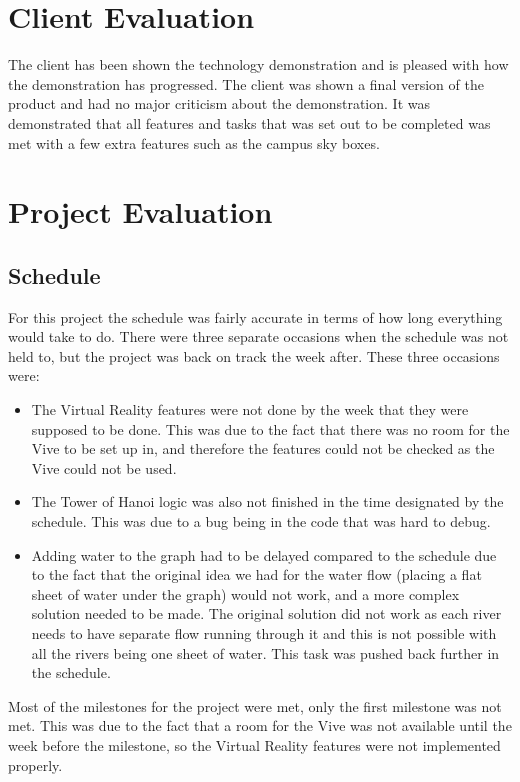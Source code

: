 \section{Client Evaluation}
	The client has been shown the technology demonstration and is pleased with how the demonstration has progressed. The client was shown a final version of the product and had no major criticism about the demonstration. It was demonstrated that all features and tasks that was set out to be completed was met with a few extra features such as the campus sky boxes.

\section{Project Evaluation}
\subsection{Schedule}
	For this project the schedule was fairly accurate in terms of how long everything would take to do. There were three separate occasions when the schedule was not held to, but the project was back on track the week after. These three occasions were:
	\begin{itemize}
		\item The Virtual Reality features were not done by the week that they were supposed to be done. This was due to the fact that there was no room for the Vive to be set up in, and therefore the features could not be checked as the Vive could not be used.
		\item The Tower of Hanoi logic was also not finished in the time designated by the schedule. This was due to a bug being in the code that was hard to debug.
		\item Adding water to the graph had to be delayed compared to the schedule due to the fact that the original idea we had for the water flow (placing a flat sheet of water under the graph) would not work, and a more complex solution needed to be made. The original solution did not work as each river needs to have separate flow running through it and this is not possible with all the rivers being one sheet of water. This task was pushed back further in the schedule.
	\end{itemize}

	Most of the milestones for the project were met, only the first milestone was not met. This was due to the fact that a room for the Vive was not available until the week before the milestone, so the Virtual Reality features were not implemented properly.

